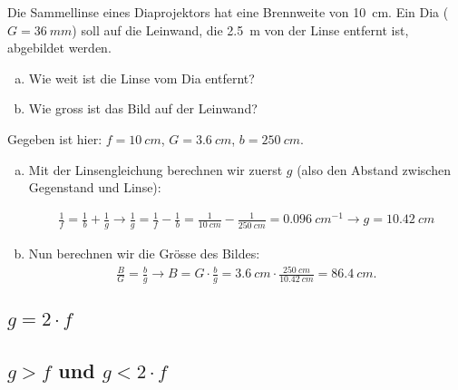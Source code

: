 \documentclass[paper=a4,twoside=true,,DIV13,BCOR1cm]{scrartcl}
\begin{document}
\begin{aufgabe}
	Die Sammellinse eines Diaprojektors hat eine Brennweite von \SI{10}{cm}. Ein Dia ($G=\SI{36}{mm}$)
	soll auf die Leinwand, die \SI{2.5}{m} von der Linse entfernt ist, abgebildet werden.
	\begin{enumerate} [a)]
		\item Wie weit ist die Linse vom Dia entfernt?
		\item Wie gross ist das Bild auf der Leinwand?
	\end{enumerate}

	\begin{loesung}
		Gegeben ist hier: $f=\SI{10}{cm}$, $G=\SI{3.6}{cm}$, $b=\SI{250}{cm}$.

		\begin{enumerate} [a)]
			\item Mit der Linsengleichung berechnen wir zuerst $g$ (also den Abstand zwischen Gegenstand und Linse):

			\begin{eqnarray*}
			\frac{1}{f}=\frac{1}{b}+\frac{1}{g}\to\frac{1}{g}=\frac{1}{f}-\frac{1}{b}=\frac{1}{\SI{10}{cm}}-\frac{1}{\SI{250}{cm}}=\SI{0.096}{cm^{-1}}\to g=\SI{10.42}{cm}
		\end{eqnarray*}
			\item Nun berechnen wir die Grösse des Bildes:
				\begin{eqnarray*}
					\frac{B}{G}=\frac{b}{g}\to B = G\cdot\frac{b}{g}=\SI{3.6}{cm}\cdot\frac{\SI{250}{cm}}{\SI{10.42}{cm}}=\SI{86.4}{cm}\text{.}
				\end{eqnarray*}

		\end{enumerate}
	\end{loesung}


\end{aufgabe}

\subsection*{$g=2\cdot f$}

\subsection*{$g>f$ und $g<2\cdot f$}
\end{document}
